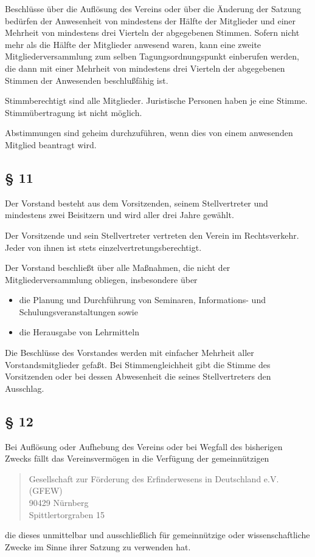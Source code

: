 \documentclass[11pt,a4paper]{article}
\begin{document}
Beschlüsse über die Auflösung des Vereins oder über die Änderung der Satzung
bedürfen der Anwesenheit von mindestens der Hälfte der Mitglieder und einer
Mehrheit von mindestens drei Vierteln der abgegebenen Stimmen. Sofern nicht
mehr als die Hälfte der Mitglieder anwesend waren, kann eine zweite
Mitgliederversammlung zum selben Tagungsordnungspunkt einberufen werden, die
dann mit einer Mehrheit von mindestens drei Vierteln der abgegebenen Stimmen
der Anwesenden beschlußfähig ist.

Stimmberechtigt sind alle Mitglieder.  Juristische Personen haben je eine
Stimme.  Stimmüber\-tragung ist nicht möglich.

Abstimmungen sind geheim durchzuführen, wenn dies von einem anwesenden
Mitglied beantragt wird.
\subsection*{§ 11}
Der Vorstand besteht aus dem Vorsitzenden, seinem Stellvertreter und
mindestens zwei Beisitzern und wird aller drei Jahre gewählt.

Der Vorsitzende und sein Stellvertreter vertreten den Verein im Rechtsverkehr.
Jeder von ihnen ist stets einzelvertretungsberechtigt.

Der Vorstand beschließt über alle Maßnahmen, die nicht der
Mitgliederversammlung obliegen, insbesondere über
\begin{itemize}
\item die Planung und Durchführung von Seminaren, Informations- und
  Schulungsveranstaltungen sowie
\item die Herausgabe von Lehrmitteln
\end{itemize}
Die Beschlüsse des Vorstandes werden mit einfacher Mehrheit aller
Vorstandsmitglieder gefaßt. Bei Stimmengleichheit gibt die Stimme des
Vorsitzenden oder bei dessen Abwesenheit die seines Stellvertreters den
Ausschlag.
\subsection*{§ 12}
Bei Auflösung oder Aufhebung des Vereins oder bei Wegfall des bisherigen
Zwecks fällt das Vereinsvermögen in die Verfügung der gemeinnützigen
\begin{quote}
  Gesellschaft zur Förderung des Erfinderwesens in Deutschland e.V. (GFEW)\\
  90429 Nürnberg\\
  Spittlertorgraben 15 
\end{quote}
die dieses unmittelbar und ausschließlich für gemeinnützige oder
wissenschaftliche Zwecke im Sinne ihrer Satzung zu verwenden hat.
\end{document}
